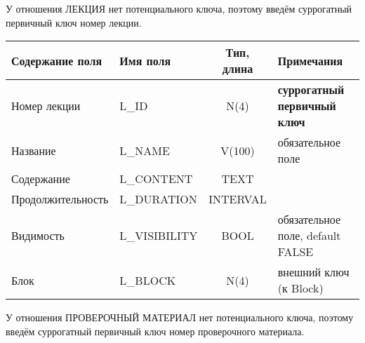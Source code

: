 \documentclass[a4paper,14pt]{article}
\begin{document}

У отношения ЛЕКЦИЯ нет потенциального ключа, поэтому введём суррогатный первичный ключ номер лекции.

\begin{table}[H]
	\begin{flushleft} 
	\end{flushleft}
\begin{adjustbox}{width=\linewidth}
	\begin{tabular}{|l|l|c|l|}
		\hline
		Содержание поля   & Имя поля      & Тип, длина & Примечания                          \\ \hline
		Номер лекции      & L\_ID         &    N(4)    & \textbf{суррогатный первичный ключ} \\ \hline
		Название          & L\_NAME       &   V(100)   & обязательное поле                   \\ \hline
		Содержание        & L\_CONTENT    &    TEXT    &                                     \\ \hline
		Продолжительность & L\_DURATION   &  INTERVAL  &                                     \\ \hline
		Видимость         & L\_VISIBILITY &    BOOL    & обязательное поле, default FALSE    \\ \hline
		Блок              & L\_BLOCK      &    N(4)    & внешний ключ (к Block)              \\ \hline
	\end{tabular}
\end{adjustbox}
\end{table}

У отношения ПРОВЕРОЧНЫЙ МАТЕРИАЛ нет потенциального ключа, поэтому введём суррогатный первичный ключ номер проверочного материала.
\end{document}
